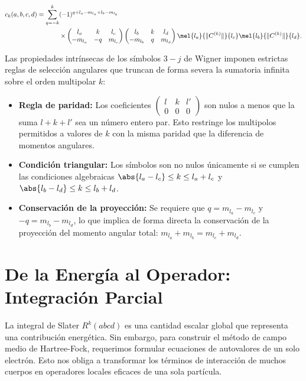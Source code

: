 \begin{align}
  c_k(a,b,c,d) = \sum_{q=-k}^k & (-1)^{q + l_a - m_{l_a} + l_b - m_{l_b}} \nonumber \\
  & \times \begin{pmatrix} l_a & k & l_c \\ -m_{l_a} & -q & m_{l_c} \end{pmatrix} \begin{pmatrix} l_b & k & l_d \\ -m_{l_b} & q & m_{l_d} \end{pmatrix} \mel{l_a}{\|C^{(k)}\|}{l_c}\mel{l_b}{\|C^{(k)}\|}{l_d}.
\end{align}

Las propiedades intrínsecas de los símbolos \( 3-j \) de Wigner imponen estrictas reglas de selección angulares que truncan de forma severa la sumatoria infinita sobre el orden multipolar \( k \):

\begin{itemize}
\item \textbf{Regla de paridad:} Los coeficientes \( \begin{pmatrix} l & k & l' \\ 0 & 0 & 0 \end{pmatrix} \) son nulos a menos que la suma \( l + k + l' \) sea un número entero par. Esto restringe los multipolos permitidos a valores de \( k \) con la misma paridad que la diferencia de momentos angulares.
\item \textbf{Condición triangular:} Los símbolos son no nulos únicamente si se cumplen las condiciones algebraicas \( \abs{l_a - l_c} \le k \le l_a + l_c \) y \( \abs{l_b - l_d} \le k \le l_b + l_d \).
\item \textbf{Conservación de la proyección:} Se requiere que \( q = m_{l_a} - m_{l_c} \) y \( -q = m_{l_b} - m_{l_d} \), lo que implica de forma directa la conservación de la proyección del momento angular total: \( m_{l_a} + m_{l_b} = m_{l_c} + m_{l_d} \).
\end{itemize}

\section{De la Energía al Operador: Integración Parcial}

La integral de Slater \( R^k(abcd) \) es una cantidad escalar global que representa una contribución energética. Sin embargo, para construir el método de campo medio de Hartree-Fock, requerimos formular ecuaciones de autovalores de un solo electrón. Esto nos obliga a transformar los términos de interacción de muchos cuerpos en operadores locales eficaces de una sola partícula.

